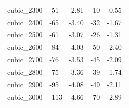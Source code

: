 \begin{table}[h!]
{\begin{tabular}{lllll}
            cubic\_2300 & -51 & -2.81 & -10 & -0.55 \\
            cubic\_2400 & -65 & -3.40 & -32 & -1.67 \\
            cubic\_2500 & -61 & -3.07 & -26 & -1.31 \\
            cubic\_2600 & -84 & -4.03 & -50 & -2.40 \\
            cubic\_2700 & -76 & -3.53 & -45 & -2.09 \\
            cubic\_2800 & -75 & -3.36 & -39 & -1.74 \\
            cubic\_2900 & -95 & -4.08 & -49 & -2.11 \\
            cubic\_3000 & -113 & -4.66 & -70 & -2.89 \\
            \bottomrule
        \end{tabular}
    }{
}
\end{table}
